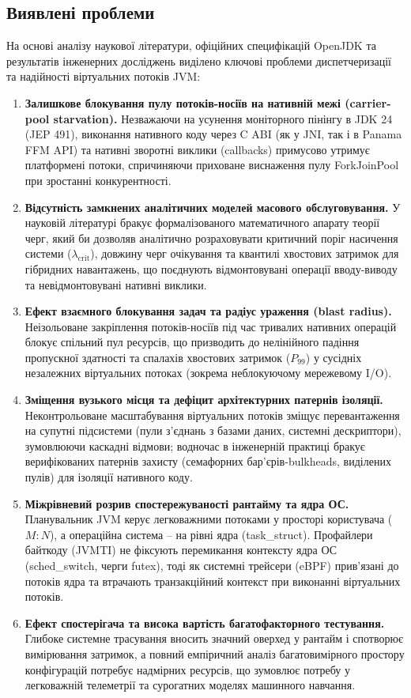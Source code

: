 \subsection{Виявлені проблеми}

На основі аналізу наукової літератури, офіційних специфікацій OpenJDK та результатів інженерних досліджень виділено ключові проблеми диспетчеризації та надійності віртуальних потоків JVM:

\begin{enumerate}[wide]
    \item \textbf{Залишкове блокування пулу потоків-носіїв на нативній межі (carrier-pool starvation).} Незважаючи на усунення моніторного пінінгу в JDK 24 (JEP 491), виконання нативного коду через C ABI (як у JNI, так і в Panama FFM API) та нативні зворотні виклики (callbacks) примусово утримує платформені потоки, спричиняючи приховане виснаження пулу \foreignlanguage{english}{ForkJoinPool} при зростанні конкурентності.
    \item \textbf{Відсутність замкнених аналітичних моделей масового обслуговування.} У науковій літературі бракує формалізованого математичного апарату теорії черг, який би дозволяв аналітично розраховувати критичний поріг насичення системи ($\lambda_{\mathrm{crit}}$), довжину черг очікування та квантилі хвостових затримок для гібридних навантажень, що поєднують відмонтовувані операції вводу-виводу та невідмонтовувані нативні виклики.
    \item \textbf{Ефект взаємного блокування задач та радіус ураження (blast radius).} Неізольоване закріплення потоків-носіїв під час тривалих нативних операцій блокує спільний пул ресурсів, що призводить до нелінійного падіння пропускної здатності та спалахів хвостових затримок ($P_{99}$) у сусідніх незалежних віртуальних потоках (зокрема неблокуючому мережевому I/O).
    \item \textbf{Зміщення вузького місця та дефіцит архітектурних патернів ізоляції.} Неконтрольоване масштабування віртуальних потоків зміщує перевантаження на супутні підсистеми (пули з'єднань з базами даних, системні дескриптори), зумовлюючи каскадні відмови; водночас в інженерній практиці бракує верифікованих патернів захисту (семафорних бар'єрів-bulkheads, виділених пулів) для ізоляції нативного коду.
    \item \textbf{Міжрівневий розрив спостережуваності рантайму та ядра ОС.} Планувальник JVM керує легковажними потоками у просторі користувача ($M:N$), а операційна система -- на рівні ядра (\foreignlanguage{english}{task\_struct}). Профайлери байткоду (JVMTI) не фіксують перемикання контексту ядра ОС (\foreignlanguage{english}{sched\_switch}, черги \foreignlanguage{english}{futex}), тоді як системні трейсери (eBPF) прив'язані до потоків ядра та втрачають транзакційний контекст при виконанні віртуальних потоків.
    \item \textbf{Ефект спостерігача та висока вартість багатофакторного тестування.} Глибоке системне трасування вносить значний оверхед у рантайм і спотворює вимірювання затримок, а повний емпіричний аналіз багатовимірного простору конфігурацій потребує надмірних ресурсів, що зумовлює потребу у легковажній телеметрії та сурогатних моделях машинного навчання.
\end{enumerate}

